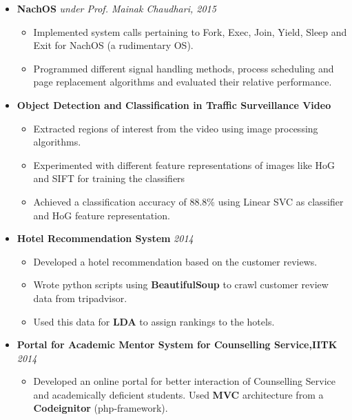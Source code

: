\documentclass[a4paper]{article}
\begin{document}
\begin{itemize}
  \item
    \textbf{NachOS}
    \hfill \textit{under Prof. Mainak Chaudhari, 2015}
      \begin{itemize}
      \setlength\itemsep{-0.2em}
        \item Implemented system calls pertaining to Fork, Exec, Join, Yield, Sleep and Exit for NachOS (a rudimentary OS).
        \item Programmed different signal handling methods, process scheduling and page replacement algorithms and evaluated
their relative performance.
      \end{itemize}

  \item
    \textbf{Object Detection and Classification in Traffic Surveillance Video}
      \begin{itemize}
      \setlength\itemsep{-0.2em}
        \item Extracted regions of interest from the video using image processing algorithms.
        \item Experimented with different feature representations of images like HoG and SIFT for training the classifiers
        \item Achieved a classification accuracy of 88.8\%  using Linear SVC as classifier and HoG feature representation.
      \end{itemize}



  \item
    \textbf{Hotel Recommendation System}
    \hfill \textit{2014}
	   \begin{itemize}
      \setlength\itemsep{-0.2em}
	    \item Developed a hotel recommendation based on the customer reviews.
        \item Wrote python scripts using \textbf{BeautifulSoup} to crawl customer review data from tripadvisor.
        \item Used this data for \textbf{LDA} to assign rankings to the hotels.
	   \end{itemize}
    \item
\vspace{3mm}
    \textbf{Portal for Academic Mentor System for Counselling Service,IITK}
    \hfill \textit{2014}
	   \begin{itemize}
	    \item Developed an online portal for better interaction of Counselling 
            Service and academically deficient students. Used \textbf{MVC} architecture 
            from a \textbf{Codeignitor} (php-framework).
	   \end{itemize}
      \end{itemize}
\end{document}
